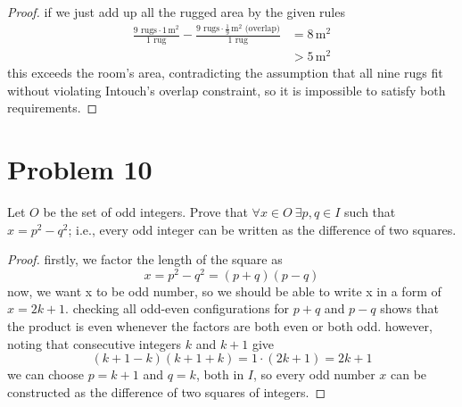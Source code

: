 \medskip
\solution

\begin{proof}
if we just add up all the rugged area by the given rules
  \[
  \begin{aligned}
  \frac{9 \text{ rugs} \cdot 1\,\text{m}^2}{1 \text{ rug}} - \frac{9
  \text{ rugs} \cdot \tfrac{1}{9}\,\text{m}^2 \text{ (overlap)}}{1
  \text{ rug}} &= 8\,\text{m}^2\\
  &> 5\,\text{m}^2
  \end{aligned}
  \]
  this exceeds the room’s area, contradicting the assumption that all
  nine rugs fit without violating Intouch’s overlap constraint, so it
  is impossible to satisfy both requirements.
\end{proof}

\vspace{1em}
\hrulefill


\section*{Problem 10}
Let $O$ be the set of odd integers. Prove that $\forall x \in O\ \exists p,q \in I$ such that $x = p^2 - q^2$; i.e., every odd integer can be written as the difference of two squares.

\medskip
\solution

\begin{proof}
  firstly, we factor the length of the square as
  \[
  x = p^2 - q^2 = (p+q)(p-q)
  \]
  now, we want x to be odd number, so we should be able to write x in a
  form of $x = 2k + 1$. checking all odd-even configurations for $p+q$
  and $p-q$ shows that the product is even whenever the factors are
  both even or both odd. however, noting that consecutive integers $k$
  and $k+1$ give
  \[
  (k + 1 - k)(k + 1 + k) = 1 \cdot (2k + 1) = 2k + 1
  \]
  we can choose $p = k+1$ and $q = k$, both in $I$, so every odd number
  $x$ can be constructed as the difference of two squares of integers.
\end{proof}

\vspace{1em}
\hrulefill



